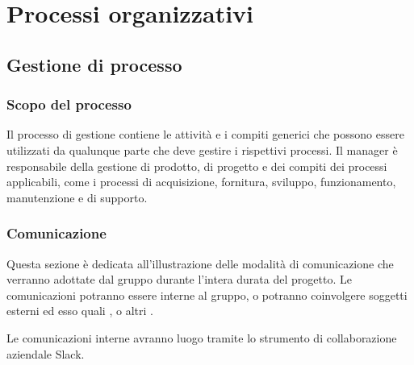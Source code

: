 \section{Processi organizzativi} \label{processi organizzativi}

	\subsection{Gestione di processo}

		\subsubsection{Scopo del processo}

			Il processo di gestione contiene le attività e i compiti generici che possono essere utilizzati da qualunque
			parte che deve gestire i rispettivi processi. Il manager è responsabile della gestione di prodotto,
			di progetto e dei compiti dei processi applicabili, come i processi di acquisizione, fornitura, sviluppo,
			funzionamento, manutenzione e di supporto.


        \subsubsection{Comunicazione}\label{comunicazione}

            Questa sezione è dedicata all'illustrazione delle modalità di comunicazione che verranno 
            adottate dal gruppo \GroupName{} durante l'intera durata del progetto. Le comunicazioni 
            potranno essere interne al gruppo, o potranno coinvolgere soggetti esterni ed esso quali 
            ,  o altri .


                Le comunicazioni interne avranno luogo tramite lo strumento di collaborazione aziendale Slack.

